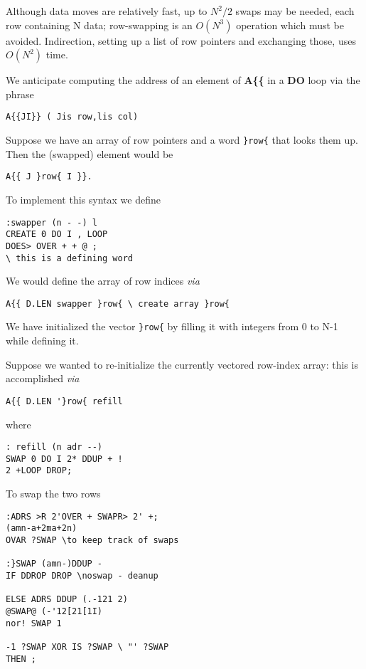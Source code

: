 Although data moves are relatively fast, up to $N^2/2$ swaps may be
needed, each row containing N data; row-swapping is an $O(N^3)$
operation which must be avoided. Indirection, setting up a list of
row pointers and exchanging those, uses $O(N^2)$ time.


We anticipate computing the address of an element of \textbf{A\{\{} in a
\textbf{DO} loop via the phrase 

\begin{verbatim}
A{{JI}} ( Jis row,lis col)
\end{verbatim}

Suppose we have an array of row pointers and a word \verb|}row{| that
looks them up. Then the (swapped) element would be

\begin{verbatim}
A{{ J }row{ I }}.
\end{verbatim}

To implement this syntax we define

\begin{verbatim}
:swapper (n - -) l
CREATE 0 DO I , LOOP
DOES> OVER + + @ ;
\ this is a defining word
\end{verbatim}
 
We would define the array of row indices \textit{via}

\begin{verbatim}
A{{ D.LEN swapper }row{ \ create array }row{
\end{verbatim}

We have initialized the vector \verb|}row{| by filling it with integers
from 0 to N-1 while defining it.

Suppose we wanted to re-initialize the currently vectored row-index array: this is accomplished \textit{via}

\begin{verbatim}
A{{ D.LEN '}row{ refill 
\end{verbatim}

where

\begin{verbatim}
: refill (n adr --)
SWAP 0 DO I 2* DDUP + !
2 +LOOP DROP;
\end{verbatim}

To swap the two rows

\begin{verbatim}
:ADRS >R 2'OVER + SWAPR> 2' +;
(amn-a+2ma+2n)
OVAR ?SWAP \to keep track of swaps

:}SWAP (amn-)DDUP -
IF DDROP DROP \noswap - deanup

ELSE ADRS DDUP (.-121 2)
@SWAP@ (-'12[21[1I)
nor! SWAP 1

-1 ?SWAP XOR IS ?SWAP \ "' ?SWAP
THEN ;
\end{verbatim}

